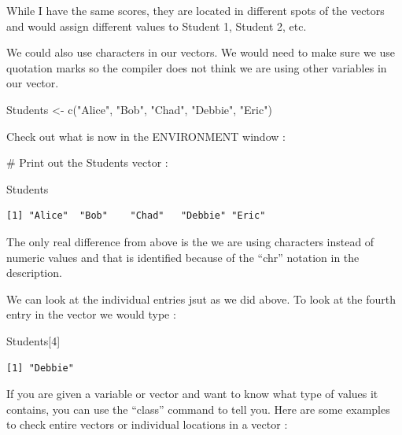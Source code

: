 \documentclass[
  letterpaper,
  DIV=11,
  numbers=noendperiod]{scrreprt}
\newenvironment{Shaded}{\begin{snugshade}}{\end{snugshade}}
\newcommand{\CommentTok}[1]{\textcolor[rgb]{0.37,0.37,0.37}{#1}}
\newcommand{\DecValTok}[1]{\textcolor[rgb]{0.68,0.00,0.00}{#1}}
\newcommand{\FunctionTok}[1]{\textcolor[rgb]{0.28,0.35,0.67}{#1}}
\newcommand{\NormalTok}[1]{\textcolor[rgb]{0.00,0.23,0.31}{#1}}
\newcommand{\OtherTok}[1]{\textcolor[rgb]{0.00,0.23,0.31}{#1}}
\newcommand{\StringTok}[1]{\textcolor[rgb]{0.13,0.47,0.30}{#1}}
\begin{document}
While I have the same scores, they are located in different spots of the
vectors and would assign different values to Student 1, Student 2, etc.

We could also use characters in our vectors. We would need to make sure
we use quotation marks so the compiler does not think we are using other
variables in our vector.

\begin{Shaded}
\begin{Highlighting}[]
\NormalTok{Students }\OtherTok{\textless{}{-}} \FunctionTok{c}\NormalTok{(}\StringTok{"Alice"}\NormalTok{, }\StringTok{"Bob"}\NormalTok{, }\StringTok{"Chad"}\NormalTok{, }\StringTok{"Debbie"}\NormalTok{, }\StringTok{"Eric"}\NormalTok{)}
\end{Highlighting}
\end{Shaded}

Check out what is now in the ENVIRONMENT window :

\begin{Shaded}
\begin{Highlighting}[]
\CommentTok{\# Print out the Students vector :}

\NormalTok{Students}
\end{Highlighting}
\end{Shaded}

\begin{verbatim}
[1] "Alice"  "Bob"    "Chad"   "Debbie" "Eric"  
\end{verbatim}

The only real difference from above is the we are using characters
instead of numeric values and that is identified because of the ``chr''
notation in the description.

We can look at the individual entries jsut as we did above. To look at
the fourth entry in the vector we would type :

\begin{Shaded}
\begin{Highlighting}[]
\NormalTok{Students[}\DecValTok{4}\NormalTok{]}
\end{Highlighting}
\end{Shaded}

\begin{verbatim}
[1] "Debbie"
\end{verbatim}

If you are given a variable or vector and want to know what type of
values it contains, you can use the ``class'' command to tell you. Here
are some examples to check entire vectors or individual locations in a
vector :
\end{document}
